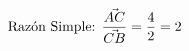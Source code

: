 \documentclass[preview]{standalone}
\begin{document}
\begin{align*}
\special{dvisvgm:raw <g id='unique000'>}\text{Razón Simple: } \frac{\vec{AC}}{\vec{CB}} = \frac{4}{2} = 2\special{dvisvgm:raw </g>}
\end{align*}
\end{document}
